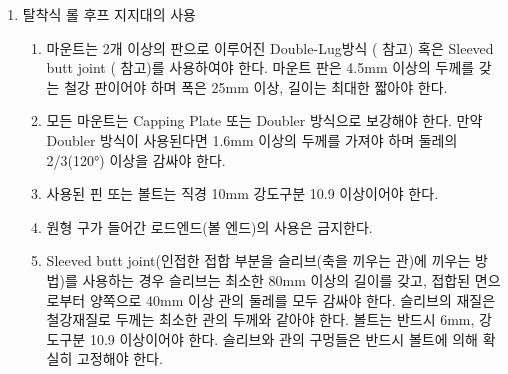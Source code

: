 \documentclass[final,a4paper,10pt]{report}
\begin{document}
\begin{enumerate}
\begin{enumerate}
      \item\label{rule:formula-technical.roll-hoop-bracing.alternatives.removable-bracing} 탈착식 롤 후프 지지대의 사용
        \begin{enumerate}
            \item\label{rule:formula-technical.roll-hoop-bracing.alternatives.removable-bracing.double-lug-or-sleeve} 마운트는 2개 이상의 판으로 이루어진 Double-Lug방식 ( 참고) 혹은 Sleeved butt joint ( 참고)를 사용하여야 한다. 마운트 판은 4.5mm 이상의 두께를 갖는 철강 판이어야 하며 폭은 25mm 이상, 길이는 최대한 짧아야 한다.
            \item\label{rule:formula-technical.roll-hoop-bracing.alternatives.removable-bracing.doubler-or-capping-plate} 모든 마운트는 Capping Plate 또는 Doubler 방식으로 보강해야 한다. 만약 Doubler 방식이 사용된다면 1.6mm 이상의 두께를 가져야 하며 둘레의 2/3(120°) 이상을 감싸야 한다.
            \item\label{rule:formula-technical.roll-hoop-bracing.alternatives.removable-bracing.pin-bolt-10mm-grade109} 사용된 핀 또는 볼트는 직경 10mm 강도구분 10.9 이상이어야 한다.
            \item\label{rule:formula-technical.roll-hoop-bracing.alternatives.removable-bracing.no-spherical-rod-end} 원형 구가 들어간 로드엔드(볼 엔드)의 사용은 금지한다.
            \item\label{rule:formula-technical.roll-hoop-bracing.alternatives.removable-bracing.sleeve-joint-dimensions} Sleeved butt joint(인접한 접합 부분을 슬리브(축을 끼우는 관)에 끼우는 방법)를 사용하는 경우 슬리브는 최소한 80mm 이상의 길이를 갖고, 접합된 면으로부터 양쪽으로 40mm 이상 관의 둘레를 모두 감싸야 한다. 슬리브의 재질은 철강재질로 두께는 최소한 관의 두께와 같아야 한다. 볼트는 반드시 6mm, 강도구분 10.9 이상이어야 한다. 슬리브와 관의 구멍들은 반드시 볼트에 의해 확실히 고정해야 한다.
        \end{enumerate}
    \end{enumerate}
\end{enumerate}
\end{document}
